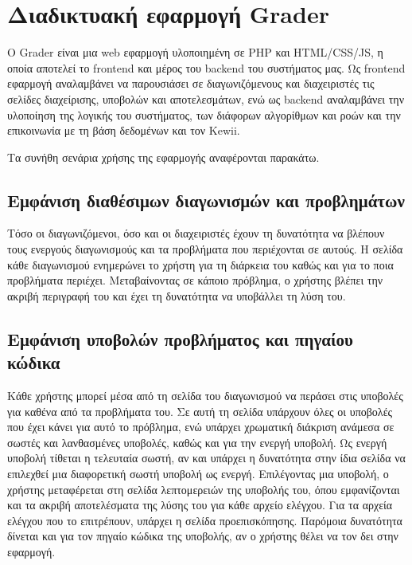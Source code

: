 \documentclass[diploma]{softlab-thesis}
\begin{document}
\section{Διαδικτυακή εφαρμογή Grader}

Ο Grader είναι μια web εφαρμογή υλοποιημένη σε PHP και HTML/CSS/JS, η οποία
αποτελεί το frontend και μέρος του backend του συστήματος μας. Ως frontend
εφαρμογή αναλαμβάνει να παρουσιάσει σε διαγωνιζόμενους και διαχειριστές τις
σελίδες διαχείρισης, υποβολών και αποτελεσμάτων, ενώ ως backend αναλαμβάνει την
υλοποίηση της λογικής του συστήματος, των διάφορων αλγορίθμων και ροών και την
επικοινωνία με τη βάση δεδομένων και τον Kewii.

\bigskip

Τα συνήθη σενάρια χρήσης της εφαρμογής αναφέρονται παρακάτω.

\subsection{Εμφάνιση διαθέσιμων διαγωνισμών και προβλημάτων}

Τόσο οι διαγωνιζόμενοι, όσο και οι διαχειριστές έχουν τη δυνατότητα να βλέπουν
τους ενεργούς διαγωνισμούς και τα προβλήματα που περιέχονται σε αυτούς. Η
σελίδα κάθε διαγωνισμού ενημερώνει το χρήστη για τη διάρκεια του καθώς και για
το ποια προβλήματα περιέχει. Μεταβαίνοντας σε κάποιο πρόβλημα, ο χρήστης βλέπει
την ακριβή περιγραφή του και έχει τη δυνατότητα να υποβάλλει τη λύση του.

\subsection{Εμφάνιση υποβολών προβλήματος και πηγαίου κώδικα}

Κάθε χρήστης μπορεί μέσα από τη σελίδα του διαγωνισμού να περάσει στις υποβολές
για καθένα από τα προβλήματα του. Σε αυτή τη σελίδα υπάρχουν όλες οι υποβολές
που έχει κάνει για αυτό το πρόβλημα, ενώ υπάρχει χρωματική διάκριση ανάμεσα σε
σωστές και λανθασμένες υποβολές, καθώς και για την ενεργή υποβολή. Ως ενεργή
υποβολή τίθεται η τελευταία σωστή, αν και υπάρχει η δυνατότητα στην ίδια
σελίδα να επιλεχθεί μια διαφορετική σωστή υποβολή ως ενεργή. Επιλέγοντας μια
υποβολή, ο χρήστης μεταφέρεται στη σελίδα λεπτομερειών της υποβολής του, όπου
εμφανίζονται και τα ακριβή αποτελέσματα της λύσης του για κάθε αρχείο ελέγχου.
Για τα αρχεία ελέγχου που το επιτρέπουν, υπάρχει η σελίδα προεπισκόπησης.
Παρόμοια δυνατότητα δίνεται και για τον πηγαίο κώδικα της υποβολής, αν ο
χρήστης θέλει να τον δει στην εφαρμογή.
\end{document}
